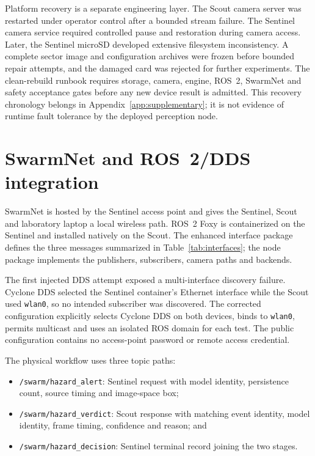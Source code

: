 Platform recovery is a separate engineering layer. The Scout camera server was
restarted under operator control after a bounded stream failure. The Sentinel
camera service required controlled pause and restoration during camera access.
Later, the Sentinel microSD developed extensive filesystem inconsistency. A
complete sector image and configuration archives were frozen before bounded
repair attempts, and the damaged card was rejected for further experiments.
The clean-rebuild runbook requires storage, camera, engine, ROS~2, SwarmNet and
safety acceptance gates before any new device result is admitted. This recovery
chronology belongs in Appendix~\ref{app:supplementary}; it is not evidence of
runtime fault tolerance by the deployed perception node.

\section{SwarmNet and ROS~2/DDS integration}
\label{sec:implementation:network}

SwarmNet is hosted by the Sentinel access point and gives the Sentinel, Scout
and laboratory laptop a local wireless path. ROS~2 Foxy is containerized on the
Sentinel and installed natively on the Scout. The enhanced interface package
defines the three messages summarized in Table~\ref{tab:interfaces}; the node
package implements the publishers, subscribers, camera paths and backends.

The first injected DDS attempt exposed a multi-interface discovery failure.
Cyclone DDS selected the Sentinel container's Ethernet interface while the
Scout used \texttt{wlan0}, so no intended subscriber was discovered. The
corrected configuration explicitly selects Cyclone DDS on both devices, binds
to \texttt{wlan0}, permits multicast and uses an isolated ROS domain for each
test. The public configuration contains no access-point password or remote
access credential.

The physical workflow uses three topic paths:

\begin{itemize}
  \item \texttt{/swarm/hazard\_alert}: Sentinel request with model identity,
  persistence count, source timing and image-space box;
  \item \texttt{/swarm/hazard\_verdict}: Scout response with matching event
  identity, model identity, frame timing, confidence and reason; and
  \item \texttt{/swarm/hazard\_decision}: Sentinel terminal record joining the
  two stages.
\end{itemize}

